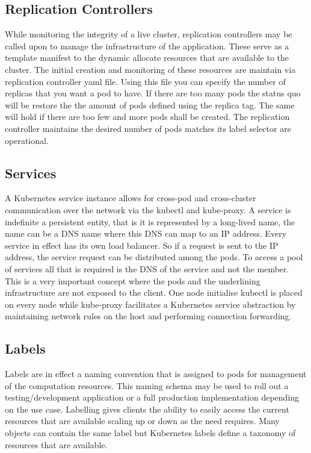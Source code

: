\documentclass{article}
\begin{document}
\subsection{Replication Controllers}
While monitoring the integrity of a live cluster, replication controllers may be called upon to manage the infrastructure of the application. These serve as a template manifest to the dynamic allocate resources that are available to the cluster. The initial creation and monitoring of these resources are maintain via replication controller yaml file.  Using this file you can specify the number of replicas that you want a pod to have. If there are too many pods the status quo will be restore the the amount of pods defined using the replica tag. The same will hold if there are too few and more pods shall be created.  The replication controller maintains the desired number of pods matches its label selector are operational.

\subsection{Services}
A Kubernetes service instance allows for cross-pod and cross-cluster communication over the network via the kubectl and kube-proxy.  A service is indefinite a persistent entity, that is it is represented by a long-lived name, the name can be a DNS name where this DNS can map to an IP address. Every service in effect has its own load balancer. So if a request is sent to the IP address, the service request can be distributed among the pods. To access a pool of services all that is required is the DNS of the service and not the member. This is a very important concept where the pods and the underlining infrastructure are not exposed to the client. One node initialise kubectl is placed on every node while kube-proxy facilitates a Kubernetes service abstraction by maintaining network rules on the host and performing connection forwarding.

\subsection{Labels}
Labels are in effect a naming convention that is assigned to pods for management of the computation resources. This naming schema may be used to roll out a testing/development application or a full production implementation depending on the use case. Labelling gives clients the ability to easily access the current resources that are available scaling up or down as the need requires. Many objects can contain the same label but Kubernetes labels define a taxonomy of resources that are available.
\end{document}
